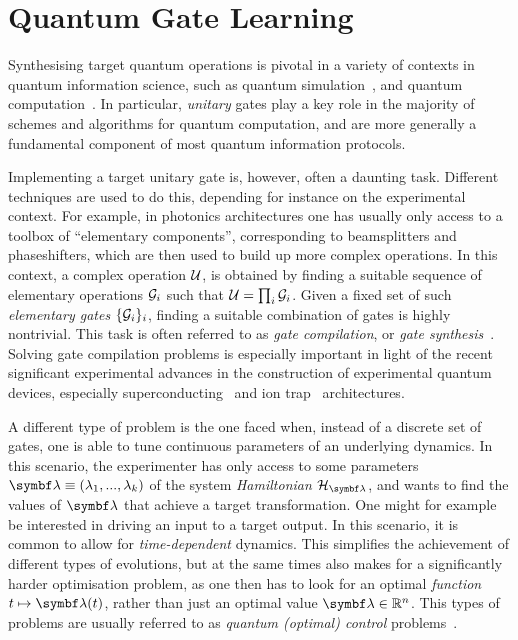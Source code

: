 
\chapter{Quantum Gate Learning}
\label{chapter:gate_learning}

Synthesising target quantum operations is pivotal in a variety of contexts in quantum information science, such as quantum simulation~\cite{feynman1982simulating,lloyd1996universal}, and quantum computation~\cite{deutsch1985quantum,gottesman1998theory,nielsen2002quantum,ladd2010quantum}.
In particular, \emph{unitary} gates play a key role in the majority of schemes and algorithms for quantum computation, and are more generally a fundamental component of most quantum information protocols.

Implementing a target unitary gate is, however, often a daunting task. Different techniques are used to do this, depending for instance on the experimental context.
For example, in photonics architectures one has usually only access to a toolbox of ``elementary components'', corresponding to beamsplitters and phaseshifters, which are then used to build up more complex operations.
In this context, a complex operation ${\mathcal{U}}$, is obtained by finding a suitable sequence of elementary operations ${\mathcal{G}}_i$ such that ${\mathcal{U}}=\prod_i {\mathcal{G}}_i$. Given a fixed set of such \textit{elementary gates} $\{{\mathcal{G}}_i\}_i$, finding a suitable combination of gates is highly nontrivial. This task is often referred to as \textit{gate compilation}, or \textit{gate synthesis}~\cite{mottonen2004quantum,nielsen2006quantum,nakajima2009synthesis,loke2014optqc,loke2016optqc,maslov2017basic,swaddle2017generating,ashouri2018survey}.
Solving gate compilation problems is especially important in light of the recent significant experimental advances in the construction of experimental quantum devices, especially superconducting~\cite{devoret2013superconducting,arute2019quantum} and ion trap~\cite{blatt2008entangled,debnath2016demonstration} architectures.

A different type of problem is the one faced when, instead of a discrete set of gates, one is able to tune continuous parameters of an underlying dynamics.
In this scenario, the experimenter has only access to some parameters $\bslambda\equiv(\lambda_1,...,\lambda_k)$ of the system \textit{Hamiltonian} $\calH_{\bslambda}$, and wants to find the values of $\bslambda$ that achieve a target transformation.
One might for example be interested in driving an input to a target output.
In this scenario, it is common to allow for \textit{time-dependent} dynamics.
This simplifies the achievement of different types of evolutions, but at the same times also makes for a significantly harder optimisation problem, as one then has to look for an optimal \textit{function} $t\mapsto\bslambda(t)$, rather than just an optimal value $\bslambda\in\mathbb R^n$.
This types of problems are usually referred to as \textit{quantum (optimal) control} problems~\cite{dalessandro2007introduction,werschnik2007quantum,dong2010quantum}.

